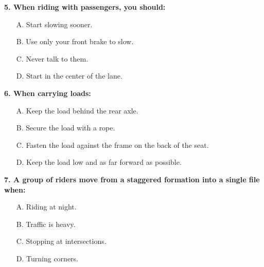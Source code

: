 \begin{minipage}{\linewidth}
\vspace{1em}\noindent\textbf{5. When riding with passengers, you should:}

\begin{itemize}[nosep,leftmargin=2em]
\item [A.] Start slowing sooner.
\item [B.] Use only your front brake to slow.
\item [C.] Never talk to them.
\item [D.] Start in the center of the lane.

\end{itemize}
\end{minipage}


\begin{minipage}{\linewidth}
\vspace{1em}\noindent\textbf{6. When carrying loads:}

\begin{itemize}[nosep,leftmargin=2em]
\item [A.] Keep the load behind the rear axle.
\item [B.] Secure the load with a rope.
\item [C.] Fasten the load against the frame on the back of the seat.
\item [D.] Keep the load low and as far forward as possible.

\end{itemize}
\end{minipage}


\begin{minipage}{\linewidth}
\vspace{1em}\noindent\textbf{7. A group of riders move from a staggered formation into a single file when:}

\begin{itemize}[nosep,leftmargin=2em]
\item [A.] Riding at night.
\item [B.] Traffic is heavy.
\item [C.] Stopping at intersections.
\item [D.] Turning corners.

\end{itemize}
\end{minipage}


